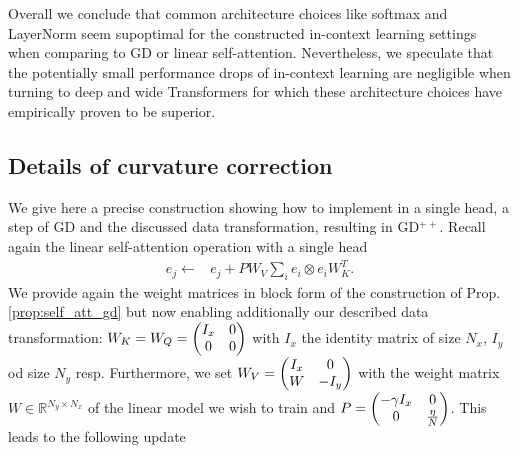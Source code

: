 \documentclass{article}
\theoremstyle{plain}
\theoremstyle{definition}
\theoremstyle{remark}
\begin{document}
Overall we conclude that common architecture choices like softmax and LayerNorm seem supoptimal for the constructed in-context learning settings when comparing to GD or linear self-attention. Nevertheless, we speculate that the potentially small performance drops of in-context learning are negligible when turning to deep and wide Transformers for which these architecture choices have empirically proven to be superior. 

\subsection{Details of curvature correction}
\label{app:curvature_details}

We give here a precise construction showing how to implement in a single head, a step of GD and the discussed data transformation, resulting in GD$^{++}$. Recall again the linear self-attention operation with a single head
\begin{align}
e_j  \leftarrow & e_j + P W_{V}\sum_{i} e_{i} \otimes e_{i} W_{K}^T.
\end{align}
We provide again the weight matrices in block form of the construction of Prop. \ref{prop:self_att_gd} but now enabling additionally our described data transformation: $W_{K} = W_{Q} = \left(\begin{array}{@{}c c@{}}
  I_x
  & 0 \\
  0 &
  0
\end{array}\right)
$ with $I_x$ the identity matrix of size $N_x$, $I_y$ od size $N_y$ resp. Furthermore, we set $W_{V} = \left(\begin{array}{@{}c c@{}}
  I_x
  & 0 \\
  W &
  -I_y
\end{array}\right)$ with the weight matrix $W \in \mathbb{R}^{N_y \times N_x}$ of the linear model we wish to train and 
$P = \left(\begin{array}{@{}c c@{}}
  -\gamma I_x
  & 0 \\
  0 &
  \frac{\eta}{N}
\end{array}\right)$. This leads to the following update
\end{document}
